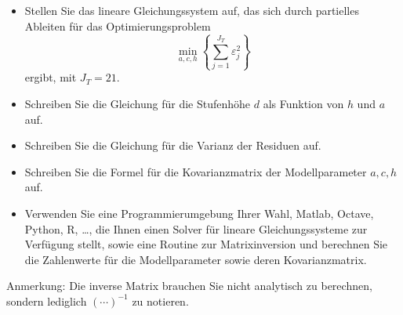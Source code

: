 \begin{itemize}
	\item[(a)] Stellen Sie das lineare Gleichungssystem auf, das sich durch partielles Ableiten
	für das Optimierungsproblem
	$$
	\min\limits_{a,c,h} \left\{\sum_{j=1}^{J_T} \varepsilon_j^2\right\}
	$$
	ergibt, mit $J_T = 21$.
	\item[(b)] Schreiben Sie die Gleichung für die Stufenhöhe $d$ als Funktion von $h$ und $a$ auf.
	\item[(c)] Schreiben Sie die Gleichung für die Varianz der Residuen auf.
	\item[(d)] Schreiben Sie die Formel für die Kovarianzmatrix der Modellparameter
	$a, c, h$ auf.
	\item[(e)] Verwenden Sie eine Programmierumgebung Ihrer Wahl, Matlab, Octave, Python, R, \ldots,
	die Ihnen einen Solver für lineare Gleichungssysteme zur Verfügung stellt, sowie
	eine Routine zur Matrixinversion und berechnen Sie die Zahlenwerte für die Modellparameter
	sowie deren Kovarianzmatrix.
\end{itemize}
Anmerkung: Die inverse Matrix brauchen Sie nicht analytisch zu berechnen, sondern
	lediglich $(\cdots)^{-1}$ zu notieren.
